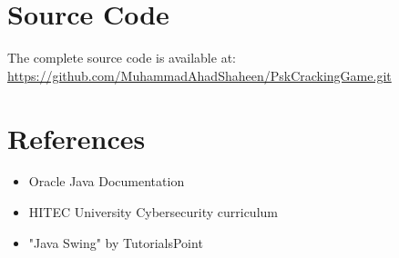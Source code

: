 \documentclass[12pt,a4paper]{report}
\begin{document}
\appendix
\chapter{Source Code}
The complete source code is available at:\\
\url{https://github.com/MuhammadAhadShaheen/PskCrackingGame.git}

\chapter*{References}
\begin{itemize}
    \item Oracle Java Documentation
    \item HITEC University Cybersecurity curriculum
    \item "Java Swing" by TutorialsPoint
\end{itemize}
\end{document}

